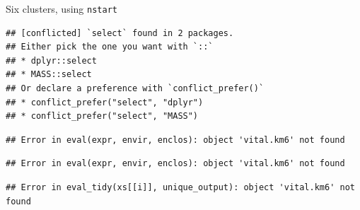 \documentclass[ignorenonframetext,]{beamer}
\newenvironment{Shaded}{\begin{snugshade}}{\end{snugshade}}
\newcommand{\DataTypeTok}[1]{\textcolor[rgb]{0.13,0.29,0.53}{#1}}
\newcommand{\DecValTok}[1]{\textcolor[rgb]{0.00,0.00,0.81}{#1}}
\newcommand{\FloatTok}[1]{\textcolor[rgb]{0.00,0.00,0.81}{#1}}
\newcommand{\KeywordTok}[1]{\textcolor[rgb]{0.13,0.29,0.53}{\textbf{#1}}}
\newcommand{\NormalTok}[1]{#1}
\newcommand{\OperatorTok}[1]{\textcolor[rgb]{0.81,0.36,0.00}{\textbf{#1}}}
\newcommand{\StringTok}[1]{\textcolor[rgb]{0.31,0.60,0.02}{#1}}
\begin{document}
\begin{frame}[fragile]{Six clusters, using \texttt{nstart}}
\protect\hypertarget{six-clusters-using-nstart}{}

\begin{Shaded}
\end{Shaded}

\begin{verbatim}
## [conflicted] `select` found in 2 packages.
## Either pick the one you want with `::` 
## * dplyr::select
## * MASS::select
## Or declare a preference with `conflict_prefer()`
## * conflict_prefer("select", "dplyr")
## * conflict_prefer("select", "MASS")
\end{verbatim}

\begin{Shaded}
\end{Shaded}

\begin{verbatim}
## Error in eval(expr, envir, enclos): object 'vital.km6' not found
\end{verbatim}

\begin{Shaded}
\end{Shaded}

\begin{verbatim}
## Error in eval(expr, envir, enclos): object 'vital.km6' not found
\end{verbatim}

\begin{Shaded}
\end{Shaded}

\begin{verbatim}
## Error in eval_tidy(xs[[i]], unique_output): object 'vital.km6' not found
\end{verbatim}

\end{frame}
\end{document}
